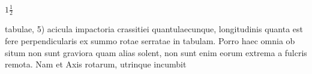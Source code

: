 $\displaystyle1\frac{1}{2}$\rule[-4mm]{0mm}{10mm} tabulae, 5) acicula impactoria crassitiei quantulaecunque, longitudinis\protect{} quanta est fere perpendicularis ex summo rotae serratae in tabulam. Porro haec omnia ob situm non sunt graviora quam alias solent, non sunt enim eorum extrema a fulcris remota. \pend \pstart Nam et Axis rotarum, utrinque incumbit